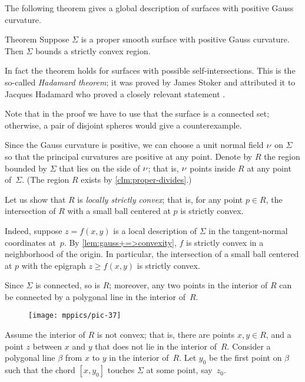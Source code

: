 The following theorem gives a global description of surfaces with positive Gauss curvature.

\begin{thm}{Theorem}\label{thm:convex-embedded}
Suppose $\Sigma$ is a proper smooth surface with positive Gauss curvature.
Then $\Sigma$ bounds a strictly convex region.
\end{thm}

In fact the theorem holds for surfaces with possible self-intersections. 
This is the so-called {}\emph{Hadamard theorem};
it was proved by James Stoker \cite{stoker} and attributed it to Jacques Hadamard who proved a closely relevant statement \cite[item 23]{hadamard}.

Note that in the proof we have to use that the surface is a connected set;
otherwise, a pair of disjoint spheres would give a counterexample.

Since the Gauss curvature is positive, we can choose a unit normal field $\nu$ on $\Sigma$ so that the principal curvatures are positive at any point.
Denote by $R$ the region bounded by $\Sigma$ that lies on the side of $\nu$;
that is, $\nu$ points inside $R$ at any point of~$\Sigma$.
(The region $R$ exists by \ref{clm:proper-divides}.)

Let us show that $R$ is {}\emph{locally strictly convex};
that is, for any point $p\in R$, the intersection of $R$ with a small ball centered at $p$ is strictly convex.

Indeed, suppose $z=f(x,y)$ is a local description of $\Sigma$ in the tangent-normal coordinates at~$p$.
By \ref{lem:gauss+=>convexity}, $f$ is strictly convex in a neighborhood of the origin.
In particular, the intersection of a small ball centered at $p$ with the epigraph $z\ge f(x,y)$ is strictly convex.

Since $\Sigma$ is connected, so is $R$;
moreover, any two points in the interior of $R$ can be connected by a polygonal line in the interior of~$R$.

\begin{wrapfigure}{o}{43 mm}
\vskip-0mm
\centering
\texttt{[image: mppics/pic-37]}
\vskip-0mm
\end{wrapfigure}

Assume the interior of $R$ is not convex;
that is, there are points $x,y\in R$, and a point $z$ between $x$ and $y$ that does not lie in the interior of~$R$.
Consider a polygonal  line $\beta$ from $x$ to $y$ in the interior of~$R$.
Let $y_0$ be the first point on $\beta$ such that the chord $[x,y_0]$ touches $\Sigma$ at some point, say~$z_0$.

